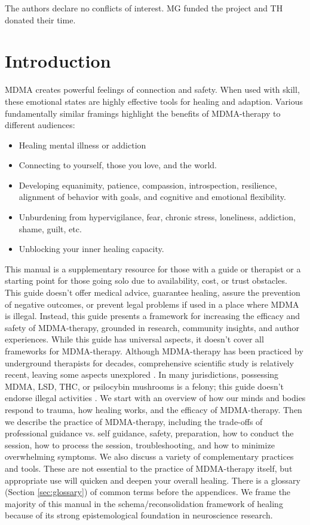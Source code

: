 \documentclass[12pt,letterpaper]{article}
\begin{document}
The authors declare no conflicts of interest. MG funded the project and TH donated their time.
\section{Introduction}
MDMA creates powerful feelings of connection and safety. When used with skill, these emotional states are highly effective tools for healing and adaption. Various fundamentally similar framings highlight the benefits of MDMA-therapy to different audiences:
\begin{itemize}
    \item Healing mental illness or addiction
    \item Connecting to yourself, those you love, and the world.
    \item Developing equanimity, patience, compassion, introspection, resilience, alignment of behavior with goals, and cognitive and emotional flexibility.
    \item Unburdening from hypervigilance, fear, chronic stress, loneliness, addiction, shame, guilt, etc.
    \item Unblocking your inner healing capacity.
\end{itemize}
This manual is a supplementary resource for those with a guide or therapist or a starting point for those going solo due to availability, cost, or trust obstacles. This guide doesn't offer medical advice, guarantee healing, assure the prevention of negative outcomes, or prevent legal problems if used in a place where MDMA is illegal. Instead, this guide presents a framework for increasing the efficacy and safety of MDMA-therapy, grounded in research, community insights, and author experiences. While this guide has universal aspects, it doesn't cover all frameworks for MDMA-therapy. Although MDMA-therapy has been practiced by underground therapists for decades, comprehensive scientific study is relatively recent, leaving some aspects unexplored \cite{passieHistory}. In many jurisdictions, possessing MDMA, LSD, THC, or psilocybin mushrooms is a felony; this guide doesn't endorse illegal activities \cite{alphaLegalization}.
We start with an overview of how our minds and bodies respond to trauma, how healing works, and the efficacy of MDMA-therapy. Then we describe the practice of MDMA-therapy, including the trade-offs of professional guidance vs. self guidance, safety, preparation, how to conduct the session, how to process the session, troubleshooting, and how to minimize overwhelming symptoms. We also discuss a variety of complementary practices and tools. These are not essential to the practice of MDMA-therapy itself, but appropriate use will quicken and deepen your overall healing. There is a glossary (Section \ref{sec:glossary}) of common terms before the appendices. We frame the majority of this manual in the schema/reconsolidation framework of healing because of its strong epistemological foundation in neuroscience research.
\end{document}
